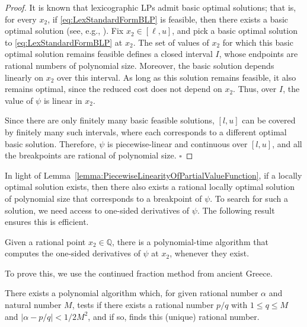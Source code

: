 \documentclass[runningheads,orivec]{llncs}
\newcommand{\MacroColor}[1]{#1}
\newcommand{\MyQED}{\mbox{}\hfill$\square$}
\newcommand{\PartialOptValFunc}{\MacroColor{\psi}}
\begin{document}
\begin{appendix}
\begin{proof}
It is known that lexicographic LPs admit basic optimal solutions; that is, for every $x_2$, if \eqref{eq:LexStandardFormBLP} is feasible, then there exists a basic optimal solution (see, e.g., \cite{isermann1982linear}).
Fix $x_2 \in [\ell, u]$, and pick a basic optimal solution to \eqref{eq:LexStandardFormBLP} at $x_2$.  
The set of values of $x_2$ for which this basic optimal solution remains feasible defines a closed interval $I$, whose endpoints are rational numbers of polynomial size.
Moreover, the basic solution depends linearly on $x_2$ over this interval.  
As long as this solution remains feasible, it also remains optimal, since the reduced cost does not depend on $x_2$.
Thus, over $I$, the value of $\PartialOptValFunc$ is linear in $x_2$.

Since there are only finitely many basic feasible solutions, $[l, u]$ can be covered by finitely many such intervals, where each corresponds to a different optimal basic solution.  
Therefore, $\PartialOptValFunc$ is piecewise-linear and continuous over $[l, u]$, and all the breakpoints are rational of polynomial size.
\MyQED
\end{proof}

In light of Lemma~\ref{lemma:PiecewiseLinearityOfPartialValueFunction}, if a locally optimal solution exists, then there also exists a rational locally optimal solution of polynomial size that corresponds to a breakpoint of $\PartialOptValFunc$.
To search for such a solution, we need access to one-sided derivatives of $\PartialOptValFunc$.
The following result ensures this is efficient.

\begin{lemma}
\label{lemma:OneSidedDerivativeOfPartialOptValFunction}
Given a rational point $x_2 \in \mathbb{Q}$, there is a polynomial-time algorithm that computes the one-sided derivatives of $\PartialOptValFunc$ at $x_2$, whenever they exist.
\end{lemma}

To prove this, we use the continued fraction method from ancient Greece.

\begin{lemma}
\label{lemma:ContinuedFractionMethod}
There exists a polynomial algorithm which, for given rational number $\alpha$ and natural number $M$, tests if there exists a rational number $p/q$ with $1 \le q \le M$ and $|\alpha - p/q| < 1/2M^2$, and if so, finds this (unique) rational number.
\end{lemma}


\end{appendix}
\end{document}
